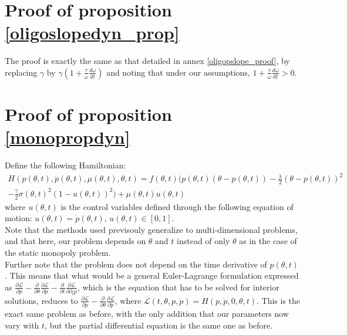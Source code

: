 \begin{subappendices}
\section{Proof of proposition \ref{oligoslopedyn_prop}}\label{oligoslopedyn_proof}
The proof is exactly the same as that detailed in annex \ref{oligopslope_proof}, by replacing $\gamma$ by $\gamma(1+\frac{\tau}{\omega}\frac{d\omega}{dt})$ and noting that under our assumptions, $1+\frac{\tau}{\omega}\frac{d\omega}{dt}>0$. 

\section{Proof of proposition \ref{monopropdyn}}\label{monopdyn_proof}

Define the following Hamiltonian: 
\begin{equation}
\begin{split}
H(p(\theta,t),\dot{p}(\theta,t),\mu(\theta,t),\theta,t)= f(\theta,t)\bigg( p(\theta,t)(\theta-p(\theta,t))-\frac{\lambda}{2}(\theta-p(\theta,t))^2\\
-\frac{\gamma}{2}\sigma(\theta,t)^2\left(1-u(\theta,t)\right)^2\bigg)+\mu(\theta,t) u(\theta,t)
\end{split}
\end{equation}
where $u(\theta,t)$ is the control variables defined through the following equation of motion: $u(\theta,t)=\dot{p}(\theta,t)$, $u(\theta,t)\in[0,1]$. \\

Note that the methods used previsouly generalize to multi-dimensional problems, and that here, our problem depends on $\theta$ and $t$ instead of only $\theta$ as in the case of the static monopoly problem. \\

Further note that the problem does not depend on the time derivative of $p(\theta,t)$. This means that what would be a general Euler-Lagrange formulation expressed as $\frac{\partial\mathcal{L}}{\partial p} - \frac{\partial}{\partial \theta}\frac{\partial \mathcal{L}}{\partial \dot{p}} - \frac{\partial}{\partial t}\frac{\partial \mathcal{L}}{\partial \partial_t p}$, which is the equation that has to be solved for interior solutions, reduces to  $\frac{\partial\mathcal{L}}{\partial p} - \frac{\partial}{\partial \theta}\frac{\partial \mathcal{L}}{\partial \dot{p}}$, where  $\mathcal{L}(t,\theta,p,\dot{p}) = H(p,\dot{p},0,\theta,t)$. This is the exact same problem as before, with the only addition that our parameters now vary with $t$, but the partial differential equation is the same one as before. \\


\end{subappendices}
